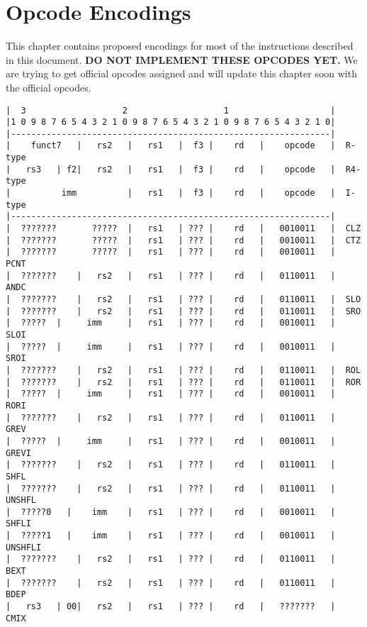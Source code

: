 \chapter{Opcode Encodings}
\label{opcodes}

This chapter contains proposed encodings for most of the instructions described
in this document. {\bf DO NOT IMPLEMENT THESE OPCODES YET.} We are trying to get
official opcodes assigned and will update this chapter soon with the official
opcodes.



\begin{verbatim}
|  3                   2                   1                    |
|1 0 9 8 7 6 5 4 3 2 1 0 9 8 7 6 5 4 3 2 1 0 9 8 7 6 5 4 3 2 1 0|
|---------------------------------------------------------------|
|    funct7   |   rs2   |   rs1   |  f3 |    rd   |    opcode   |  R-type
|   rs3   | f2|   rs2   |   rs1   |  f3 |    rd   |    opcode   |  R4-type
|          imm          |   rs1   |  f3 |    rd   |    opcode   |  I-type
|---------------------------------------------------------------|
|  ???????       ?????  |   rs1   | ??? |    rd   |   0010011   |  CLZ
|  ???????       ?????  |   rs1   | ??? |    rd   |   0010011   |  CTZ
|  ???????       ?????  |   rs1   | ??? |    rd   |   0010011   |  PCNT
|  ???????    |   rs2   |   rs1   | ??? |    rd   |   0110011   |  ANDC
|  ???????    |   rs2   |   rs1   | ??? |    rd   |   0110011   |  SLO
|  ???????    |   rs2   |   rs1   | ??? |    rd   |   0110011   |  SRO
|  ?????  |     imm     |   rs1   | ??? |    rd   |   0010011   |  SLOI
|  ?????  |     imm     |   rs1   | ??? |    rd   |   0010011   |  SROI
|  ???????    |   rs2   |   rs1   | ??? |    rd   |   0110011   |  ROL
|  ???????    |   rs2   |   rs1   | ??? |    rd   |   0110011   |  ROR
|  ?????  |     imm     |   rs1   | ??? |    rd   |   0010011   |  RORI
|  ???????    |   rs2   |   rs1   | ??? |    rd   |   0110011   |  GREV
|  ?????  |     imm     |   rs1   | ??? |    rd   |   0010011   |  GREVI
|  ???????    |   rs2   |   rs1   | ??? |    rd   |   0110011   |  SHFL
|  ???????    |   rs2   |   rs1   | ??? |    rd   |   0110011   |  UNSHFL
|  ?????0   |    imm    |   rs1   | ??? |    rd   |   0010011   |  SHFLI
|  ?????1   |    imm    |   rs1   | ??? |    rd   |   0010011   |  UNSHFLI
|  ???????    |   rs2   |   rs1   | ??? |    rd   |   0110011   |  BEXT
|  ???????    |   rs2   |   rs1   | ??? |    rd   |   0110011   |  BDEP
|   rs3   | 00|   rs2   |   rs1   | ??? |    rd   |   ???????   |  CMIX

\end{verbatim}
